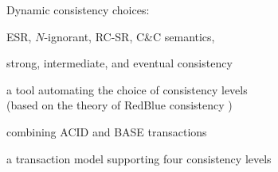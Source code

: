 \begin{frame}{}
  Dynamic consistency choices:
  \begin{description}[Parameterized]
    \setlength{\itemsep}{8pt}
    \item[Parameterized] ESR, $N$-ignorant, RC-SR, C\&C semantics, \red{\rvsi{}}
    \item[Pileus] strong, intermediate, and eventual consistency 
    \item[\textsc{SIEVE}] a tool automating the choice of consistency levels  \\
      {\small (based on the theory of RedBlue consistency )}
    \item[Salt] combining ACID and BASE transactions 
    \item[Multi-level] a transaction model supporting four consistency levels 
  \end{description}
\end{frame}
